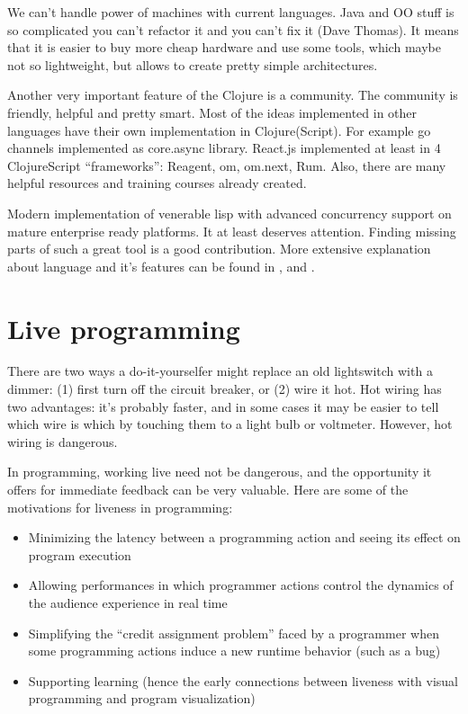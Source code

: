 We can't handle power of machines with current languages. Java and OO stuff is
so complicated you can't refactor it and you can't fix it (Dave Thomas). It
means that it is easier to buy more cheap hardware and use some tools, which
maybe not so lightweight, but allows to create pretty simple architectures.

Another very important feature of the Clojure is a community. The community is
friendly, helpful and pretty smart. Most of the ideas implemented in other
languages have their own implementation in Clojure(Script). For example go
channels implemented as core.async library. React.js implemented at least in 4
ClojureScript “frameworks”: Reagent, om, om.next, Rum. Also, there are many
helpful resources and training courses already created.

Modern implementation of venerable lisp with advanced concurrency support on
mature enterprise ready platforms. It at least deserves attention. Finding
missing parts of such a great tool is a good contribution. More extensive
explanation about language and it's features can be found in
\cite{halloway2009programming}, \cite{fogus2011joy} and
\cite{hickey2008clojure}.


\section{Live programming}

There are two ways a do-it-yourselfer might replace an old lightswitch with a
dimmer: (1) first turn off the circuit breaker, or (2) wire it hot. Hot wiring
has two advantages: it’s probably faster, and in some cases it may be easier to
tell which wire is which by touching them to a light bulb or voltmeter. However,
hot wiring is dangerous.

In programming, working live need not be dangerous, and the opportunity it
offers for immediate feedback can be very valuable. Here are some of the
motivations for liveness in programming:

\begin{itemize}
\item Minimizing the latency between a programming action and seeing its effect
  on program execution
\item Allowing performances in which programmer actions control the dynamics of
  the audience experience in real time
\item Simplifying the “credit assignment problem” faced by a programmer when
  some programming actions induce a new runtime behavior (such as a bug)
\item Supporting learning (hence the early connections between liveness with
  visual programming and program visualization)
\end{itemize}

